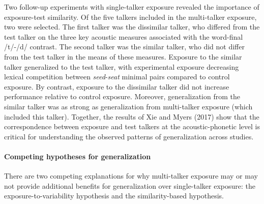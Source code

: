 \documentclass[
  12pt,
  twoside]{article}
\begin{document}
Two follow-up experiments with single-talker exposure revealed the importance of exposure-test similarity.
Of the five talkers included in the multi-talker exposure, two were selected.
The first talker was the dissimilar talker, who differed from the test talker on the three key acoustic measures associated with the word-final /t/-/d/ contrast.
The second talker was the similar talker, who did not differ from the test talker in the means of these measures.
Exposure to the similar talker generalized to the test talker, with experimental exposure decreasing lexical competition between \emph{seed}-\emph{seat} minimal pairs compared to control exposure.
By contrast, exposure to the dissimilar talker did not increase performance relative to control exposure.
Moreover, generalization from the similar talker was as strong as generalization from multi-talker exposure (which included this talker).
Together, the results of Xie and Myers (2017) show that the correspondence between exposure and test talkers at the acoustic-phonetic level is critical for understanding the observed patterns of generalization across studies.

\hypertarget{competing-hypotheses-for-generalization}{%
\paragraph{Competing hypotheses for generalization}\label{competing-hypotheses-for-generalization}}

There are two competing explanations for why multi-talker exposure may or may not provide additional benefits for generalization over single-talker exposure: the exposure-to-variability hypothesis and the similarity-based hypothesis.
\end{document}
